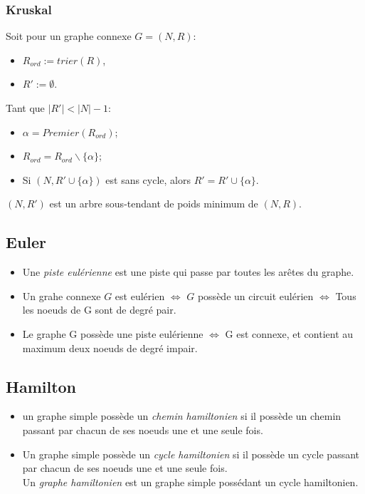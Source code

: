 \subsubsection*{Kruskal}
Soit pour un graphe connexe $G = (N,R)$:\\
\begin{itemize}
\item $R_{ord} := trier(R)$,\\
\item $R' := \emptyset$.\\
\end{itemize}
Tant que $|R'| < |N| - 1$:\\
\begin{itemize}
\item $\alpha = Premier(R_{ord})$;\\
\item $R_{ord} = R_{ord}\backslash\{\alpha\}$;\\
\item Si $(N, R' \cup \{\alpha\})$ est sans cycle, alors $R' = R' \cup \{\alpha\}$.\\
\end{itemize}
$(N, R')$ est un arbre sous-tendant de poids minimum de $(N, R)$.

\subsection{Euler}
\begin{itemize}
\item Une \emph{piste eulérienne} est une piste qui passe par toutes les arêtes du graphe.\\
\item Un grahe connexe $G$ est eulérien $\Leftrightarrow$ $G$ possède un circuit eulérien $\Leftrightarrow$ Tous les noeuds de G sont de degré pair.\\
\item Le graphe G possède une piste eulérienne $\Leftrightarrow$ G est connexe, et contient au maximum deux noeuds de degré impair.\\
\end{itemize}

\subsection{Hamilton}
\begin{itemize}
\item un graphe simple possède un \emph{chemin hamiltonien} si il possède un chemin passant par chacun de ses noeuds une et une seule fois.\\
\item Un graphe simple possède un \emph{cycle hamiltonien} si il possède un cycle passant par chacun de ses noeuds une et une seule fois.\\
Un \emph{graphe hamiltonien} est un graphe simple possédant un cycle hamiltonien.\\
\end{itemize}

